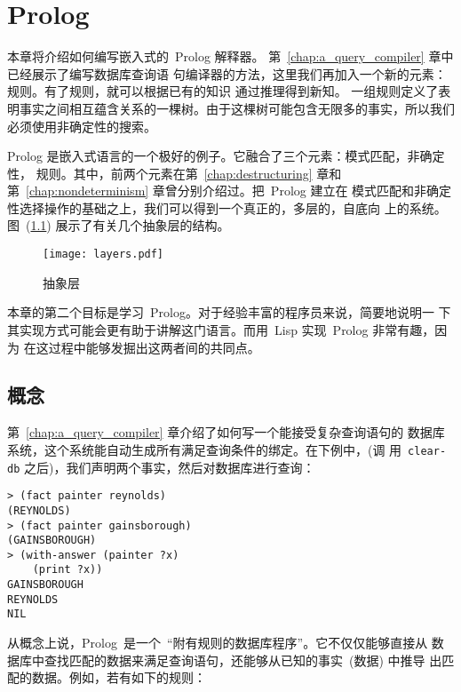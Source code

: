 
\chapter{Prolog}
\label{chap:prolog}

本章将介绍如何编写嵌入式的~Prolog 解释器。
第~\ref{chap:a_query_compiler} 章中已经展示了编写数据库查询语
句编译器的方法，这里我们再加入一个新的元素：规则。有了规则，就可以根据已有的知识
通过推理得到新知。
一组规则定义了表明事实之间相互蕴含关系的一棵树。由于这棵树可能包含无限多的事实，所以我们必须使用非确定性的搜索。

Prolog 是嵌入式语言的一个极好的例子。它融合了三个元素：模式匹配，非确定性，
规则。其中，前两个元素在第~\ref{chap:destructuring} 章和
第~\ref{chap:nondeterminism} 章曾分别介绍过。把~Prolog 建立在
模式匹配和非确定性选择操作的基础之上，我们可以得到一个真正的，多层的，自底向
上的系统。图~(\ref{fig:layers_of_abstraction}) 展示了有关几个抽象层的结构。

\begin{figure}
  \texttt{[image: layers.pdf]}
  \caption{抽象层}
  \label{fig:layers_of_abstraction}
\end{figure}

本章的第二个目标是学习~Prolog。对于经验丰富的程序员来说，简要地说明一
下其实现方式可能会更有助于讲解这门语言。而用~Lisp 实现~Prolog 非常有趣，因为
在这过程中能够发掘出这两者间的共同点。


\section{概念}
\label{sec:prolog:concepts}

第~\ref{chap:a_query_compiler} 章介绍了如何写一个能接受复杂查询语句的
数据库系统，这个系统能自动生成所有满足查询条件的绑定。在下例中，(调
用~\verb|clear-db| 之后)，我们声明两个事实，然后对数据库进行查询：
\begin{lstlisting}
> (fact painter reynolds) 
(REYNOLDS) 
> (fact painter gainsborough) 
(GAINSBOROUGH) 
> (with-answer (painter ?x) 
    (print ?x)) 
GAINSBOROUGH 
REYNOLDS 
NIL 
\end{lstlisting}

从概念上说，Prolog~是一个~``附有规则的数据库程序''。它不仅仅能够直接从
数据库中查找匹配的数据来满足查询语句，还能够从已知的事实~(数据) 中推导
出匹配的数据。例如，若有如下的规则：

